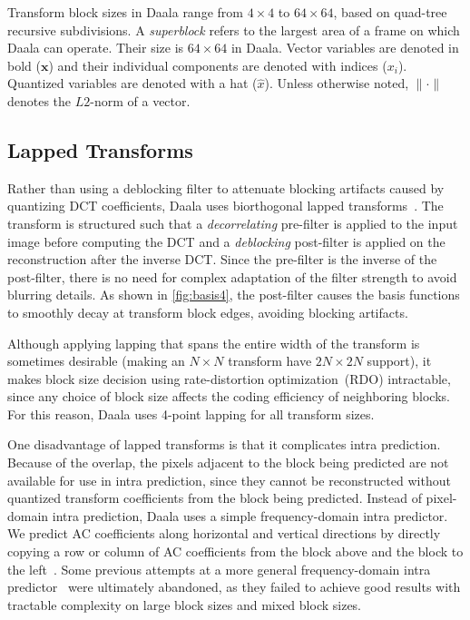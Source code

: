 \documentclass[english,conference,10pt]{IEEEtran}
\begin{document}
Transform block sizes in Daala range from $4 \times 4$
to $64 \times 64$, based on quad-tree recursive subdivisions. A
\textit{superblock} refers to the largest area of a frame on which Daala
can operate. Their size is $64\times 64$ in Daala. Vector variables are
denoted in bold ($\mathbf{x}$) and their individual components are denoted
with indices ($x_i$). Quantized variables are denoted with a hat ($\hat{x}$).
Unless otherwise noted, $\|\cdot\|$ denotes the $L2$-norm of a vector.

\subsection{Lapped Transforms}
\label{sec:lapping}

Rather than using a deblocking filter to attenuate blocking artifacts caused
by quantizing DCT coefficients, Daala uses biorthogonal lapped
transforms~\cite{MalvarS89,Tran2003}. The transform is structured such that
a \textit{decorrelating} pre-filter is applied to the input image before computing
the DCT and a \textit{deblocking} post-filter is applied on the reconstruction
after the inverse DCT\@. Since the pre-filter is the inverse of the post-filter,
there is no need for complex adaptation of the filter strength to avoid blurring
details. As shown in \cref{fig:basis4}, the post-filter causes the basis functions
to smoothly decay at transform block edges, avoiding blocking artifacts.

Although applying lapping that spans the entire width of the transform is
sometimes desirable (making an $N \times N$ transform have $2N \times 2N$ support),
it makes block size decision using rate-distortion optimization~(RDO) intractable,
since any choice of block size affects the coding efficiency of neighboring blocks. For
this reason, Daala uses 4-point lapping for all transform sizes.

One disadvantage of lapped transforms is that it complicates intra prediction.
Because of the overlap, the pixels adjacent to the block being predicted are not
available for use in intra prediction, since they cannot be reconstructed
without quantized transform coefficients from the block being predicted.
Instead of pixel-domain intra prediction, Daala uses a simple
frequency-domain intra predictor. We predict AC coefficients along horizontal
and vertical directions by directly copying a row or column of AC
coefficients from the block above and the block to the left~\cite{EggePCS}.
Some previous attempts at a more general
frequency-domain intra predictor~\cite{fdintra-demo} were ultimately abandoned,
as they failed to achieve good results with tractable complexity on large block
sizes and mixed block sizes.
\end{document}
